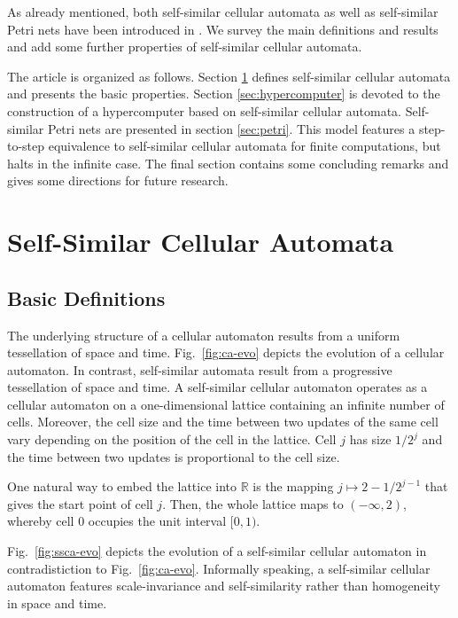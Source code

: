 \documentclass{article}
\theoremstyle{definition}
\begin{document}
As already mentioned, both self-similar cellular automata as well as self-similar Petri nets have been introduced in \cite{2008-sica}.
We survey the main definitions and results and add some further properties of self-similar cellular automata.

The article is organized as follows.
Section \ref{sec:ssca} defines self-similar cellular automata and presents the basic properties.
Section \ref{sec:hypercomputer} is devoted to the construction of a hypercomputer based on
self-similar cellular automata.
Self-similar Petri nets are presented in section \ref{sec:petri}.
This model features a step-to-step equivalence to self-similar cellular automata for finite computations, but halts
in the infinite case.
The final section contains some concluding remarks and gives some directions for future research.

\section{Self-Similar Cellular Automata}
\label{sec:ssca}

\subsection{Basic Definitions}

The underlying structure of a cellular automaton results from a uniform tessellation of space and time.
Fig.~\ref{fig:ca-evo} depicts the evolution of a cellular automaton.
In contrast, self-similar automata result from a progressive tessellation of space and time.
A self-similar cellular automaton operates as a cellular automaton on a one-dimensional lattice containing an infinite number of cells.
Moreover, the cell size and the time  between two updates of the same cell vary depending on the position of the cell in the lattice.
Cell $j$ has size $1/2^j$ and the time between two updates is proportional to the cell size.

One natural way to embed the lattice into $\mathbb{R}$ is the mapping
$j \mapsto 2 - 1/2^{j-1}$ that gives the start point of cell $j$.
Then, the whole lattice maps to  $(-\infty, 2)$, whereby cell $0$ occupies the
unit interval $[0,1)$.

Fig.~\ref{fig:ssca-evo} depicts the evolution of a self-similar cellular automaton in contradistiction to Fig.~\ref{fig:ca-evo}.
Informally speaking, a self-similar cellular automaton features scale-invariance and self-similarity rather
than homogeneity in space and time.
\end{document}
